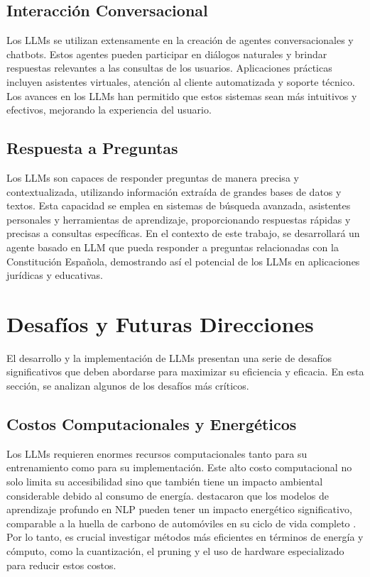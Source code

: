 \subsection{Interacción Conversacional}
Los LLMs se utilizan extensamente en la creación de agentes conversacionales y chatbots. Estos agentes pueden participar en diálogos naturales y brindar respuestas relevantes a las consultas de los usuarios. Aplicaciones prácticas incluyen asistentes virtuales, atención al cliente automatizada y soporte técnico. Los avances en los LLMs han permitido que estos sistemas sean más intuitivos y efectivos, mejorando la experiencia del usuario.

\subsection{Respuesta a Preguntas}
Los LLMs son capaces de responder preguntas de manera precisa y contextualizada, utilizando información extraída de grandes bases de datos y textos. Esta capacidad se emplea en sistemas de búsqueda avanzada, asistentes personales y herramientas de aprendizaje, proporcionando respuestas rápidas y precisas a consultas específicas. En el contexto de este trabajo, se desarrollará un agente basado en LLM que pueda responder a preguntas relacionadas con la Constitución Española, demostrando así el potencial de los LLMs en aplicaciones jurídicas y educativas.



\section{Desafíos y Futuras Direcciones}

El desarrollo y la implementación de LLMs presentan una serie de desafíos significativos que deben abordarse para maximizar su eficiencia y eficacia. En esta sección, se analizan algunos de los desafíos más críticos.

\subsection{Costos Computacionales y Energéticos}
Los LLMs requieren enormes recursos computacionales tanto para su entrenamiento como para su implementación. Este alto costo computacional no solo limita su accesibilidad sino que también tiene un impacto ambiental considerable debido al consumo de energía. \citep{strubell2020energy} destacaron que los modelos de aprendizaje profundo en NLP pueden tener un impacto energético significativo, comparable a la huella de carbono de automóviles en su ciclo de vida completo . Por lo tanto, es crucial investigar métodos más eficientes en términos de energía y cómputo, como la cuantización, el pruning y el uso de hardware especializado para reducir estos costos.

